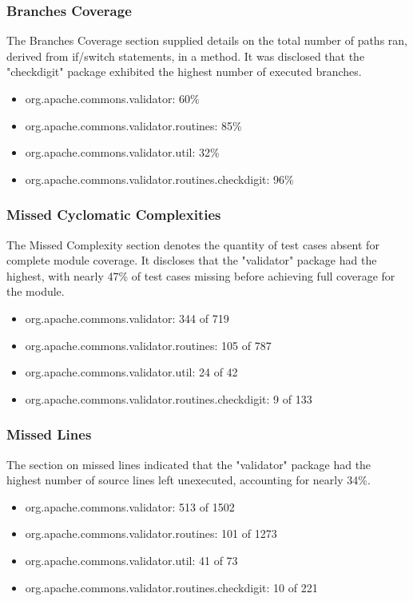 \documentclass{sigchi}
\begin{document}
\subsubsection{\textbf{Branches Coverage}}
The Branches Coverage section supplied details on the total number of paths ran, derived from if/switch statements, in a method. It was disclosed that the "checkdigit" package exhibited the highest number of executed branches.
\begin{itemize}
    \item org.apache.commons.validator: 60\%
    \item org.apache.commons.validator.routines: 85\%
    \item org.apache.commons.validator.util: 32\%
    \item org.apache.commons.validator.routines.checkdigit: 96\%
\end{itemize}

\subsubsection{\textbf{Missed Cyclomatic Complexities}}
The Missed Complexity section denotes the quantity of test cases absent for complete module coverage. It discloses that the "validator" package had the highest, with nearly 47\% of test cases missing before achieving full coverage for the module.
\begin{itemize}
    \item org.apache.commons.validator: 344 of 719
    \item org.apache.commons.validator.routines: 105 of 787
    \item org.apache.commons.validator.util: 24 of 42
    \item org.apache.commons.validator.routines.checkdigit: 9 of 133
\end{itemize}

\subsubsection{\textbf{Missed Lines}}
The section on missed lines indicated that the "validator" package had the highest number of source lines left unexecuted, accounting for nearly 34\%.
\begin{itemize}
    \item org.apache.commons.validator: 513 of 1502
    \item org.apache.commons.validator.routines: 101 of 1273
    \item org.apache.commons.validator.util: 41 of 73
    \item org.apache.commons.validator.routines.checkdigit: 10 of 221
\end{itemize}
\end{document}
